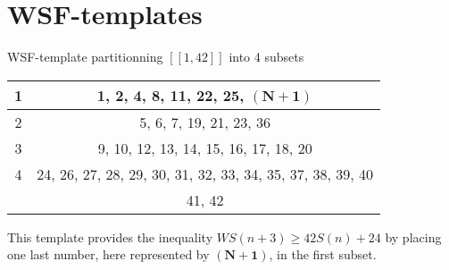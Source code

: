 \documentclass{article}
\newtheorem{computational theorem}{Computational Theorem}[section]
\begin{document}
\begin{center}
\begin{tabular}{|*{2}{c|}}
\end{tabular}
\end{center}


\section{WSF-templates}

\begin{center}
WSF-template partitionning \([\![1, 42]\!]\) into 4 subsets
\begin{tabular}{|*{2}{c|}}
	\hline
	1 & 1, 2, 4, 8, 11, 22, 25, \(\mathbf{(N+1)}\)\\
	\hline
	2 & 5, 6, 7, 19, 21, 23, 36\\
	\hline
	3 & 9, 10, 12, 13, 14, 15, 16, 17, 18, 20\\
	\hline
	4 & 24, 26, 27, 28, 29, 30, 31, 32, 33, 34, 35, 37, 38, 39, 40\\
	& 41, 42\\
	\hline
\end{tabular}
\end{center}

This template provides the inequality \(WS(n+3) \geqslant 42S(n) + 24\)
by placing one last number, here represented by \(\mathbf{(N+1)}\), in the first subset.
\end{document}
